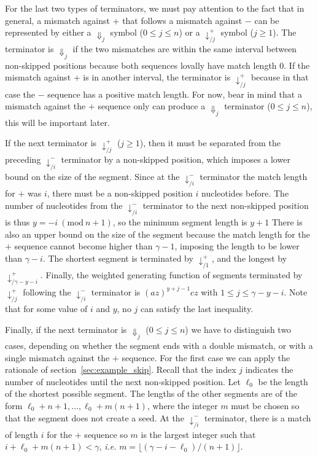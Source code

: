 \documentclass{article}
\newcommand{\modulo}[1]{\ (\mathrm{mod}\ #1)}
\begin{document}
For the last two types of terminators, we must pay attention to the fact
that in general, a mismatch against $+$ that follows a mismatch against
$-$ can be represented by either a $\Downarrow_j$ symbol ($0 \leq j \leq
n$) or a $\downarrow_{/j}^+$ symbol ($j \geq 1$). The terminator is
$\Downarrow_j$ if the two mismatches are within the same interval between
non-skipped positions because both sequences lovally have match length 0.
If the mismatch against $+$ is in another interval, the terminator is
$\downarrow_{/j}^+$ because in that case the $-$ sequence has a positive
match length. For now, bear in mind that a mismatch against the $+$
sequence only can produce a $\Downarrow_j$ terminator ($0 \leq j \leq n$),
this will be important later.

If the next terminator is $\downarrow_{/j}^+$ ($j \geq 1$), then it must
be separated from the  preceding $\downarrow_{/i}^-$ terminator by a
non-skipped position, which imposes a lower bound on the size of the
segment. Since at the $\downarrow_{/i}^-$ terminator the match length for
$+$ was $i$, there must be a non-skipped position $i$ nucleotides before.
The number of nucleotides from the $\downarrow_{/i}^-$ terminator to the
next non-skipped position is thus $y = -i \modulo{n+1}$, so the minimum
segment length is $y+1$ There is also an upper bound on the size of the
segment because the match length for the $+$ sequence cannot become higher
than $\gamma-1$, imposing the length to be lower than $\gamma-i$. The
shortest segment is terminated by $\downarrow_{/1}^+$, and the longest by
$\downarrow_{/{\gamma-y-i}}^+$. Finally, the weighted generating function
of segments terminated by $\downarrow_{/j}^+$ following the
$\downarrow_{/i}^-$ terminator is $(az)^{y+j-1}cz$ with $1 \leq j \leq
\gamma-y-i$. Note that for some value of $i$ and $y$, no $j$ can satisfy
the last inequality.

Finally, if the next terminator is $\Downarrow_j$ ($0 \leq j \leq n$) we
have to distinguish two cases, depending on whether the segment ends with
a double mismatch, or with a single mismatch against the $+$ sequence. For
the first case we can apply the rationale of
section~\ref{sec:example_skip}. Recall that the index $j$ indicates the
number of nucleotides until the next non-skipped position. Let $\ell_0$ be
the length of the shortest possible segment. The lengths of the other
segments are of the form $\ell_0 + n+1, \ldots, \ell_0 + m(n+1)$, where
the integer $m$ must be chosen so that the segment does not create a seed.
At the $\downarrow_{/i}^-$ terminator, there is a match of length $i$ for
the $+$ sequence so $m$ is the largest integer such that $i+\ell_0+m(n+1)
< \gamma$, \textit{i.e.} $m = \lfloor(\gamma-i-\ell_0) / (n+1)\rfloor$.
\end{document}
